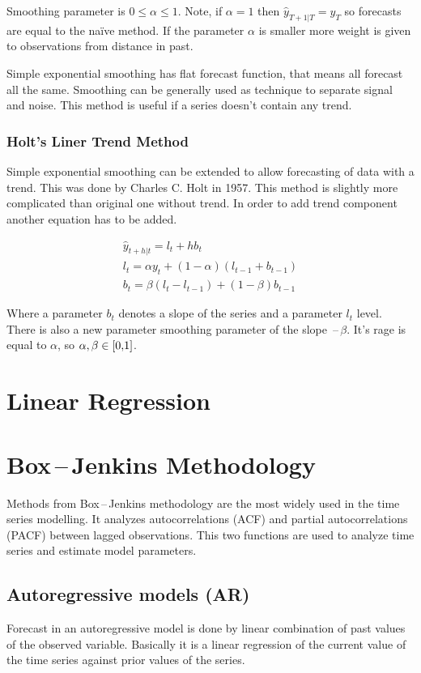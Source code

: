 Smoothing parameter is $ 0 \leq \alpha \leq 1 $. Note, if $\alpha = 1$ then 
$\hat{y}_{T+1|T} = y_{T}$ so forecasts are equal to the na\"{i}ve method.
If the parameter $\alpha $ is smaller more weight is given to observations from distance
in past. 

Simple exponential smoothing has flat forecast function, that means all forecast
all the same. Smoothing can be generally used as technique to separate signal and noise.
This method is useful if a series doesn't contain any trend.

\subsubsection{Holt's Liner Trend Method}
Simple exponential smoothing can be extended to allow forecasting of data with a trend. 
This was done by Charles C. Holt in 1957. This method is slightly more complicated than 
original one without trend. In order to add trend component another equation has to be added. 

\begin{eqnarray} \label{exp_holt}
 \hat{y}_{t+h|t} = l_{t} + hb_{t} \\
\nonumber l_t = \alpha y_t + (1 - \alpha) (l_{t-1} + b_{t-1}) \\
\nonumber b_t = \beta (l_t - l_{t-1}) + (1 - \beta)b_{t-1} 
\end{eqnarray}

Where a parameter $b_t$ denotes a slope of the series and a parameter $l_t$ level. There is also a new parameter 
smoothing parameter of the slope \,--\,$\beta$. It's rage is equal to $\alpha$, so $\alpha,\beta
\in \interval[{0,1}]$. 

\section{Linear Regression}

\section{Box\,--\,Jenkins Methodology}
Methods from Box\,--\,Jenkins methodology are the most widely used in the time series
modelling. It analyzes autocorrelations (ACF) and partial autocorrelations (PACF) between lagged
observations. This two functions are used to analyze time series and estimate model parameters. 

\subsection{Autoregressive models (AR)}
Forecast in an autoregressive model is done by linear combination of past values of the
observed variable. Basically it is a linear regression of the current value of the time series against
prior values of the series.

